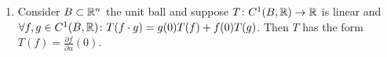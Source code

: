 \documentclass[a4paper]{article}
\newcommand\ial   {\partial}
\begin{document}
\begin{enumerate}
		We'll prove that $g_i(a) = \frac{\ial f}{\ial x_i}$. \begin{proof}
			hmm that's kinda trivial since: 
			\[ D[f] = D\csb{f(a) + \sum_{i = 1}(x_i - a)g_i} = D\csb{\sumni (x_i - a)g_i} = \sumnio x_iD[g_i] \]
			So: 
			\[ \pms{\frac{\ial f}{\ial x_1} \\ \vdots \\ \frac{\ial f}{\ial x_n}} = \nab_f = [D[f]]_\ec = \pms{\frac{\ial x_1D[g_1]}{\ial x_1} \\ \vdots \\ \frac{\ial x_nD[g_n]}{x_n}} = \pms{g_1 \\ \vdots \\ g_n} \]
			So $\frac{\ial f}{\ial x_i} = g_i$ as intended. 
			(Should have done things pointwise for formality but who cares)
		\end{proof}
		\item Consider $B \subset \mathbb{R}^{n}$ the unit ball and suppose $T \colon C^{1}(B, \mathbb{R}) \to \mathbb{R}$ is linear and $\forall f, g \in C^{1}(B, \mathbb{R}) \colon T(f \cdot g) = g(0)T(f) + f(0)T(g)$. Then $T$ has the form $T(f) = \frac{\ial f}{\ial u}(0)$. 
	\end{enumerate}
	
\end{document}
